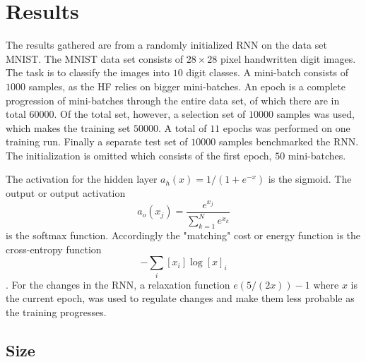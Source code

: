 \chapter{Results}

The results gathered are from a randomly initialized RNN on the data set MNIST. The MNIST data set consists of $28 \times 28$ pixel handwritten digit images. The task is to classify the images into $10$ digit classes. A mini-batch consists of $1000$ samples, as the HF relies on bigger mini-batches. An epoch is a complete progression of mini-batches through the entire data set, of which there are in total $60 000$. Of the total set, however, a selection set of $10 000$ samples was used, which makes the training set $50000$. A total of $11$ epochs was performed on one training run. Finally a separate test set of $10000$ samples benchmarked the RNN. The initialization is omitted which consists of the first epoch, $50$ mini-batches.

The activation for the hidden layer $a_h(x) = 1/(1 + e^{-x})$ is the sigmoid. The output or output activation \[a_o(x_j) = \frac{e^{x_j}}{\sum_{k=1}^N e^{x_k}}\] is the softmax function. Accordingly the "matching" cost or energy function is the cross-entropy function \[- \sum_i [x_i] \log [x]_i\]. For the changes in the RNN, a relaxation function $e(5/(2x)) - 1$ where $x$ is the current epoch, was used to regulate changes and make them less probable as the training progresses.

\section{Size}

\section{}